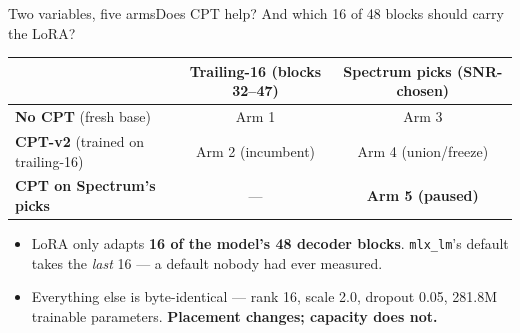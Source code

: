 \documentclass[aspectratio=169,11pt]{beamer}
\newcommand{\warn}[1]{\textcolor{jsWarm}{\textbf{#1}}}
\newcommand{\mut}[1]{\textcolor{jsMute}{#1}}
\begin{document}
\begin{frame}{Two variables, five arms}{Does CPT help? And which 16 of 48 blocks should carry the LoRA?}
  \vspace{0.3em}
  \begin{center}
  \small
  \begin{tabular}{lcc}
    \toprule
     & \textbf{Trailing-16} \mut{(blocks 32--47)} & \textbf{Spectrum picks} \mut{(SNR-chosen)} \\
    \midrule
    \textbf{No CPT} (fresh base)      & Arm 1 & Arm 3 \\
    \textbf{CPT-v2} (trained on trailing-16) & Arm 2 \mut{(incumbent)} & Arm 4 \mut{(union/freeze)} \\
    \textbf{CPT on Spectrum's picks}  & \mut{---} & \warn{Arm 5 (paused)} \\
    \bottomrule
  \end{tabular}
  \end{center}
  \vspace{0.8em}
  \small
  \begin{itemize}
    \item LoRA only adapts \textbf{16 of the model's 48 decoder blocks}. \texttt{mlx\_lm}'s default takes the \emph{last} 16 --- a default nobody had ever measured.
    \item Everything else is byte-identical --- rank 16, scale 2.0, dropout 0.05, 281.8M trainable parameters. \textbf{Placement changes; capacity does not.}
  \end{itemize}
\end{frame}
\end{document}
